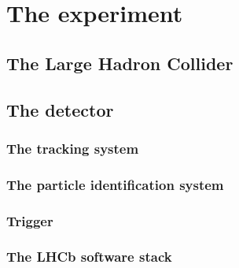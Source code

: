 \chapter{The \lhcb experiment}

\blindtext

\section{The Large Hadron Collider}

\Blindtext

\section{The \lhcb detector}

\Blindtext

\subsection{The tracking system}

\subsection{The particle identification system}

\subsection{Trigger}

\subsection{The LHCb software stack}
